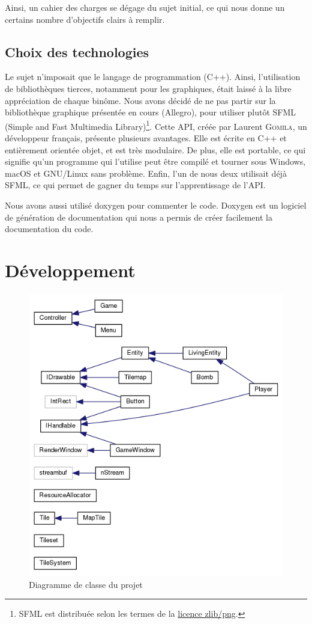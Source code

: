 \documentclass[a4paper,10pt]{report}
\begin{document}
Ainsi, un cahier des charges se dégage du sujet initial, ce qui nous donne un certains nombre d'objectifs clairs à remplir.

\section{Choix des technologies}
Le sujet n'imposait que le langage de programmation (C++). Ainsi, l'utilisation de bibliothèques tierces, notamment pour les graphiques, était laissé à la libre appréciation de chaque binôme. Nous avons décidé de ne pas partir sur la bibliothèque graphique présentée en cours (Allegro), pour utiliser plutôt SFML (Simple and Fast Multimedia Library)\footnote{SFML est distribuée selon les termes de la \href{https://opensource.org/licenses/Zlib}{licence zlib/png}.}. Cette API, créée par Laurent \textsc{Gomila}, un développeur français, présente plusieurs avantages. Elle est écrite en C++ et entièrement orientée objet, et est très modulaire. De plus, elle est portable, ce qui signifie qu'un programme qui l'utilise peut être compilé et tourner sous Windows, macOS et GNU/Linux sans problème. Enfin, l'un de nous deux utilisait déjà SFML, ce qui permet de gagner du temps sur l'apprentissage de l'API.

Nous avons aussi utilisé doxygen pour commenter le code. Doxygen est un logiciel de génération de documentation qui nous a permis de créer facilement la documentation du code.

\chapter{Développement}
\begin{figure}
 \begin{center}
  \includegraphics[scale=0.44]{uml.png}
 \end{center}
 \caption{Diagramme de classe du projet}
 \label{uml}
\end{figure}
\end{document}
